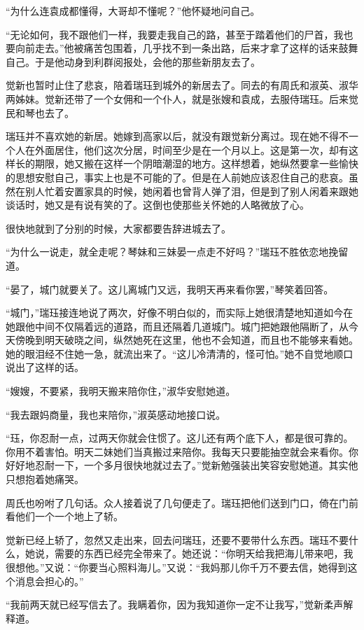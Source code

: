 \par “为什么连袁成都懂得，大哥却不懂呢？”他怀疑地问自己。
\par “无论如何，我不跟他们一样，我要走我自己的路，甚至于踏着他们的尸首，我也要向前走去。”他被痛苦包围着，几乎找不到一条出路，后来才拿了这样的话来鼓舞自己。于是他动身到利群阅报处，会他的那些新朋友去了。
\par 觉新也暂时止住了悲哀，陪着瑞珏到城外的新居去了。同去的有周氏和淑英、淑华两姊妹。觉新还带了一个女佣和一个仆人，就是张嫂和袁成，去服侍瑞珏。后来觉民和琴也去了。
\par 瑞珏并不喜欢她的新居。她嫁到高家以后，就没有跟觉新分离过。现在她不得不一个人在外面居住，他们这次分居，时间至少是在一个月以上。这是第一次，却有这样长的期限，她又搬在这样一个阴暗潮湿的地方。这样想着，她纵然要拿一些愉快的思想安慰自己，事实上也是不可能的了。但是在人前她应该忍住自己的悲哀。虽然在别人忙着安置家具的时候，她闲着也曾背人弹了泪，但是到了别人闲着来跟她谈话时，她又是有说有笑的了。这倒也使那些关怀她的人略微放了心。
\par 很快地就到了分别的时候，大家都要告辞进城去了。
\par “为什么一说走，就全走呢？琴妹和三妹晏一点走不好吗？”瑞珏不胜依恋地挽留道。
\par “晏了，城门就要关了。这儿离城门又远，我明天再来看你罢，”琴笑着回答。
\par “城门，”瑞珏接连地说了两次，好像不明白似的，而实际上她很清楚地知道如今在她跟他中间不仅隔着远的道路，而且还隔着几道城门。城门把她跟他隔断了，从今天傍晚到明天破晓之间，纵然她死在这里，他也不会知道，而且也不能够来看她。她的眼泪经不住她一急，就流出来了。“这儿冷清清的，怪可怕。”她不自觉地顺口说出了这样的话。
\par “嫂嫂，不要紧，我明天搬来陪你住，”淑华安慰她道。
\par “我去跟妈商量，我也来陪你，”淑英感动地接口说。
\par “珏，你忍耐一点，过两天你就会住惯了。这儿还有两个底下人，都是很可靠的。你用不着害怕。明天二妹她们当真搬过来陪你。我每天只要能抽空就会来看你。你好好地忍耐一下，一个多月很快地就过去了。”觉新勉强装出笑容安慰她道。其实他只想抱着她痛哭。
\par 周氏也吩咐了几句话。众人接着说了几句便走了。瑞珏把他们送到门口，倚在门前看他们一个一个地上了轿。
\par 觉新已经上轿了，忽然又走出来，回去问瑞珏，还要不要带什么东西。瑞珏不要什么，她说，需要的东西已经完全带来了。她还说：“你明天给我把海儿带来吧，我很想他。”又说：“你要当心照料海儿。”又说：“我妈那儿你千万不要去信，她得到这个消息会担心的。”
\par “我前两天就已经写信去了。我瞒着你，因为我知道你一定不让我写，”觉新柔声解释道。
